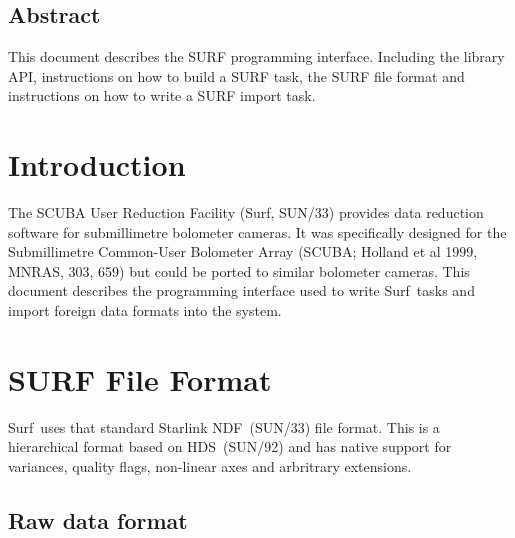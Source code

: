 \documentclass[twoside,11pt]{article}
\newcommand{\stardocinitials}  {SSN}
\newcommand{\stardocnumber}    {72.2}
\newcommand{\stardocabstract}  {This document describes the SURF programming
interface. Including the library API, instructions on how to build
a SURF task, the SURF file format and instructions on how to write
a SURF import task.}
\newcommand{\ndf}{\xref{NDF}{sun33}{}}
\newcommand{\hds}{\xref{HDS}{sun92}{}}
\newcommand{\surfref}{\xref{{\scusoft}}{sun216}{}}
\newcommand{\scusoft}          {{\sc Surf}}
\newcommand{\stardocname}{\stardocinitials /\stardocnumber}
\newenvironment{latexonly}{}{}
\newcommand{\xref}[3]{#1}
\newcommand{\xlabel}[1]{}
\renewcommand{\_}{\texttt{\symbol{95}}}
\renewcommand{\thepage}{\roman{page}}
\begin{document}
\begin{htmlonly}
  \section{\xlabel{abstract}Abstract}

\end{htmlonly}

\stardocabstract
  \newpage
  \begin{latexonly}
    \setlength{\parskip}{0mm}
    \tableofcontents
    \setlength{\parskip}{\medskipamount}
    \markboth{\stardocname}{\stardocname}
  \end{latexonly}
\cleardoublepage
\renewcommand{\thepage}{\arabic{page}}
\setcounter{page}{1}


\section{Introduction}

The SCUBA User Reduction Facility (\surfref, SUN/33) provides data reduction
software for submillimetre bolometer cameras. It was specifically designed for
the Submillimetre Common-User Bolometer Array (SCUBA; Holland et al 1999,
MNRAS, 303, 659) but could be ported to similar bolometer cameras. This
document describes the programming interface used to write \scusoft\ tasks and
import foreign data formats into the system.


\section{SURF File Format}

\scusoft\ uses that standard Starlink \ndf\ (SUN/33) file format. This
is a hierarchical format based on \hds\ (SUN/92) and has native support for
variances, quality flags, non-linear axes and arbritrary extensions.

\subsection{Raw data format\label{sec:raw}}
\end{document}

